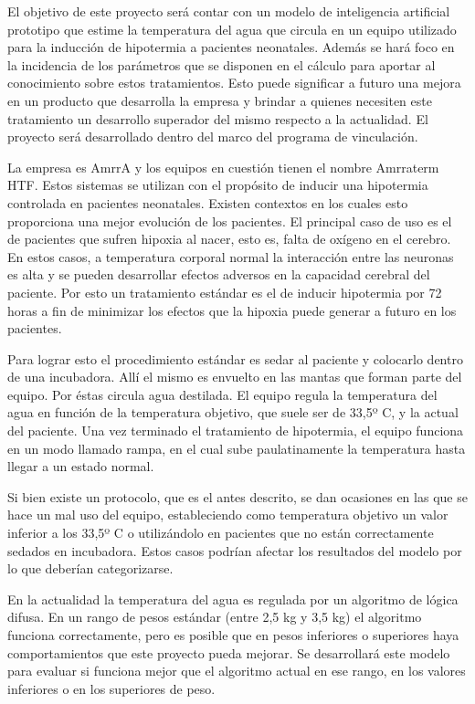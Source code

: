 \documentclass[
11pt, %
]{charter}
\begin{document}
El objetivo de este proyecto será contar con un modelo de inteligencia artificial prototipo que estime la temperatura del agua que circula en un equipo utilizado para la inducción de hipotermia a pacientes neonatales. Además se hará foco en la incidencia de los parámetros que se disponen en el cálculo para aportar al conocimiento sobre estos tratamientos. Esto puede significar a futuro una mejora en un producto que desarrolla la empresa y brindar a quienes necesiten este tratamiento un desarrollo superador del mismo respecto a la actualidad. El proyecto será desarrollado dentro del marco del programa de vinculación. 

La empresa es AmrrA y los equipos en cuestión tienen el nombre Amrraterm HTF. Estos sistemas se utilizan con el propósito de inducir una hipotermia controlada en pacientes neonatales. Existen contextos en los cuales esto proporciona una mejor evolución de los pacientes. El principal caso de uso es el de pacientes que sufren hipoxia al nacer, esto es, falta de oxígeno en el cerebro. En estos casos, a temperatura corporal normal la interacción entre las neuronas es alta y se pueden desarrollar efectos adversos en la capacidad cerebral del paciente. Por esto un tratamiento estándar es el de inducir hipotermia por 72 horas a fin de minimizar los efectos que la hipoxia puede generar a futuro en los pacientes. 

Para lograr esto el procedimiento estándar es sedar al paciente y colocarlo dentro de una incubadora. Allí el mismo es envuelto en las mantas que forman parte del equipo. Por éstas circula agua destilada. El equipo regula la temperatura del agua en función de la temperatura objetivo, que suele ser de 33,5º C, y la actual del paciente. Una vez terminado el tratamiento de hipotermia, el equipo funciona en un modo llamado rampa, en el cual sube paulatinamente la temperatura hasta llegar a un estado normal.

Si bien existe un protocolo, que es el antes descrito, se dan ocasiones en las que se hace un mal uso del equipo, estableciendo como temperatura objetivo un valor inferior a los 33,5º C o utilizándolo en pacientes que no están correctamente sedados en incubadora. Estos casos podrían afectar los resultados del modelo por lo que deberían categorizarse.

En la actualidad la temperatura del agua es regulada por un algoritmo de lógica difusa. En un rango de pesos estándar (entre 2,5 kg y 3,5 kg) el algoritmo funciona correctamente, pero es posible que en pesos inferiores o superiores haya comportamientos que este proyecto pueda mejorar. Se desarrollará este modelo para evaluar si funciona mejor que el algoritmo actual en ese rango, en los valores inferiores o en los superiores de peso. 
\end{document}
